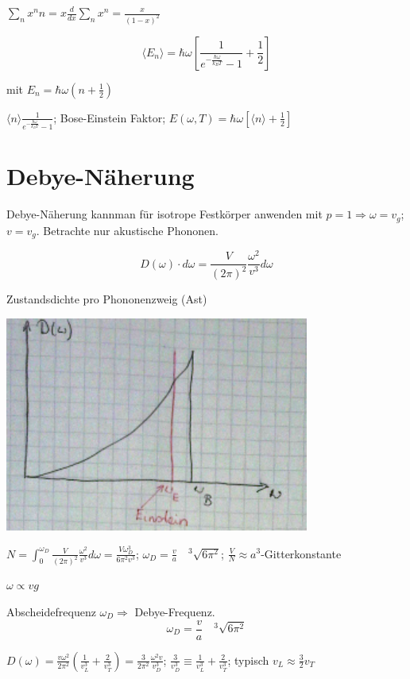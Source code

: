 \(\sum_n x^nn=x\frac{d}{dx}\sum_n x^n = \frac{x}{(1-x)^2}\)

\[ \langle E_n \rangle = \hbar \omega \left[ \frac{1}{e^{-\frac{\hbar \omega}{k_BT}}-1}+\frac{1}{2}\right]\]

mit \(E_n=\hbar\omega(n+\frac{1}{2})\)

\(\langle n \rangle \frac{1}{e^{-\frac{\hbar \omega}{k_BT}}-1}\); Bose-Einstein Faktor; \(E(\omega,T) = \hbar \omega[\langle n \rangle + \frac{1}{2}]\)


\section{Debye-Näherung}

Debye-Näherung kannman für isotrope Festkörper anwenden mit \(p=1\Rightarrow \omega = v_g\); \(v=v_g\). Betrachte nur akustische Phononen.

\[  D(\omega)\cdot d\omega = \frac{V}{(2\pi)^2} \frac{\omega^2}{v^3}  d\omega \]

Zustandsdichte pro Phononenzweig (Ast)

\includegraphics[width=0.75\textwidth]{kap06_14.png}

\(N=\int^{\omega_D}_0\frac{V}{(2\pi)^2} \frac{\omega^2}{v^3}  d\omega = \frac{V\omega^3_D}{6\pi^2 v^3}\); \(\omega_D=\frac{v}{a}\quad ^3\sqrt{6\pi^2}\); \(\frac{V}{N}\approx a^3\)-Gitterkonstante

\(\omega \propto vg\)

Abscheidefrequenz \(\omega_D \Rightarrow\) Debye-Frequenz.
\[\boxed{\omega_D=\frac{v}{a}\quad ^3\sqrt{6\pi^2}}\]

\(D(\omega)= \frac{v\omega^2}{2\pi^2}\left(\frac{1}{v_L^3}+\frac{2}{v^3_T} \right)=\frac{3}{2\pi^2}\frac{\omega^2v}{v_D^3} \); \(\frac{3}{v_D^3}\equiv\frac{1}{v_L^3}+\frac{2}{v_T^3}\); typisch \(v_L\approx \frac{3}{2}v_T\)

